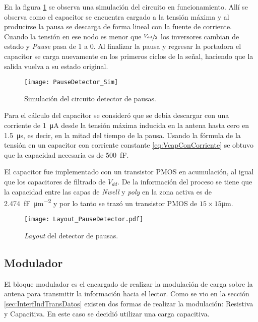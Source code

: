 En la figura \ref{fig:PauseDetectorSim} se observa una simulación 
del circuito en funcionamiento. Allí se observa como el capacitor se 
encuentra cargado a la tensión máxima y al producirse la pausa se 
descarga de forma lineal con la fuente de corriente. Cuando la tensión 
en ese nodo es menor que \(\sfrac{V_{dd}}{2}\) los inversores cambian 
de estado y \emph{Pause} pasa de 1 a 0. Al finalizar la pausa y 
regresar la portadora el capacitor se carga nuevamente en los primeros 
ciclos de la señal, haciendo que la salida vuelva a su estado 
original. 

\begin{figure}
	\centering
	\texttt{[image: PauseDetector\_Sim]}
	\caption{Simulación del circuito detector de pausas.}
	\label{fig:PauseDetectorSim}
\end{figure}

Para el cálculo del capacitor se consideró que se debía descargar 
con una corriente de \SI{1}{\micro\ampere} desde la tensión máxima 
inducida en la antena hasta cero en \SI{1.5}{\micro\second}, es 
decir, en la mitad del tiempo de la pausa. Usando la fórmula de la 
tensión en un capacitor con corriente constante 
\eqref{eq:VcapConCorriente} se obtuvo que la capacidad necesaria es de 
\SI{500}{\femto\farad}.

El capacitor fue implementado con un transistor PMOS en acumulación, 
al igual que los capacitores de filtrado de \(V_{dd}\). De la 
información del proceso se tiene que la capacidad entre las capas de 
\emph{Nwell} y \emph{poly} en la zona activa es de 
\SI[per-mode=symbol]{2.474}{\femto\farad\per\micro\meter\squared} y 
por lo tanto se trazó un transistor PMOS de 
\(15\times15\)\si{\micro\meter}.

\begin{figure}
	\centering
	\texttt{[image: Layout\_PauseDetector.pdf]}
	\caption{\emph{Layout} del detector de pausas.}
	\label{fig:PauseDetectorLayout}
\end{figure}

\subsection{Modulador}
\label{sec:Modulador}

El bloque modulador es el encargado de realizar la modulación de carga 
sobre la antena para transmitir la información hacia el lector. Como 
se vio en la sección \ref{sec:InterfIndTransDatos} existen dos 
formas de realizar la modulación: Resistiva y Capacitiva. En este caso 
se decidió utilizar una carga capacitiva.

